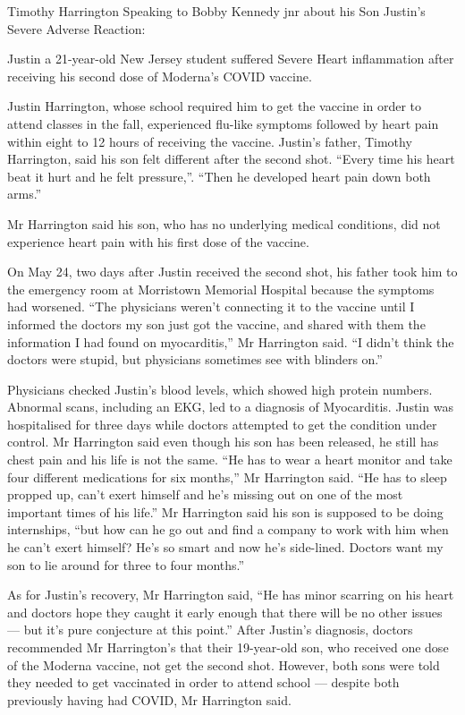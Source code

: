 Timothy Harrington Speaking to Bobby Kennedy jnr about his Son Justin’s Severe
Adverse Reaction:

Justin a 21-year-old New Jersey student suffered Severe Heart inflammation after
receiving his second dose of Moderna’s COVID vaccine.

Justin Harrington, whose school required him to get the vaccine in order to
attend classes in the fall, experienced flu-like symptoms followed by heart pain
within eight to 12 hours of receiving the vaccine. Justin’s father, Timothy
Harrington, said his son felt different after the second shot. “Every time his
heart beat it hurt and he felt pressure,”. “Then he developed heart pain down
both arms.”

Mr Harrington said his son, who has no underlying medical conditions, did not
experience heart pain with his first dose of the vaccine.

On May 24, two days after Justin received the second shot, his father took him
to the emergency room at Morristown Memorial Hospital because the symptoms had
worsened. “The physicians weren’t connecting it to the vaccine until I informed
the doctors my son just got the vaccine, and shared with them the information I
had found on myocarditis,” Mr Harrington said. “I didn’t think the doctors were
stupid, but physicians sometimes see with blinders on.”

Physicians checked Justin’s blood levels, which showed high protein
numbers. Abnormal scans, including an EKG, led to a diagnosis of
Myocarditis. Justin was hospitalised for three days while doctors attempted to
get the condition under control. Mr Harrington said even though his son has been
released, he still has chest pain and his life is not the same. “He has to wear
a heart monitor and take four different medications for six months,” Mr
Harrington said. “He has to sleep propped up, can’t exert himself and he’s
missing out on one of the most important times of his life.” Mr Harrington said
his son is supposed to be doing internships, “but how can he go out and find a
company to work with him when he can’t exert himself? He’s so smart and now he’s
side-lined. Doctors want my son to lie around for three to four months.”

As for Justin’s recovery, Mr Harrington said, “He has minor scarring on his
heart and doctors hope they caught it early enough that there will be no other
issues — but it’s pure conjecture at this point.” After Justin’s diagnosis,
doctors recommended Mr Harrington’s that their 19-year-old son, who received one
dose of the Moderna vaccine, not get the second shot. However, both sons were
told they needed to get vaccinated in order to attend school — despite both
previously having had COVID, Mr Harrington said.


